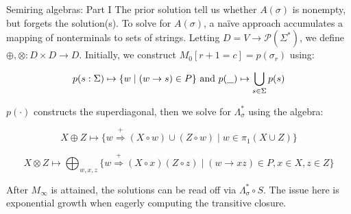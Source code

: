 \documentclass{beamer}
\newcommand\hole{\underline{\hspace{0.25cm}}}
\begin{document}
\begin{frame}[fragile]{Semiring algebras: Part I}
  The prior solution tell us whether $A(\sigma)$ is nonempty, but forgets the solution(s). To solve for $A(\sigma)$, a na\"ive approach accumulates a mapping of nonterminals to sets of strings. Letting $D = V \rightarrow \mathcal{P}(\Sigma^*)$, we define $\oplus, \otimes: D \times D \rightarrow D$. Initially, we construct $M_0[r+1=c] = p(\sigma_r)$ using:

  \begin{equation*}
    p(s: \Sigma) \mapsto \{w \mid (w \rightarrow s)\in P\} \text{ and } p(\hole) \mapsto \bigcup_{s\in \Sigma} p(s)
  \end{equation*}

  $p(\cdot)$ constructs the superdiagonal, then we solve for $\Lambda_\sigma^*$ using the algebra:

  \begin{equation*}
    X \oplus Z \mapsto \big\{w \stackrel{+}{\Rightarrow} (X \circ w) \cup (Z \circ w) \mid w \in \pi_1(X \cup Z)\big\}
  \end{equation*}

  \begin{equation*}
    X \otimes Z \mapsto \bigoplus_{w, x, z}\big\{w \stackrel{+}{\Rightarrow} (X\circ x)(Z\circ z) \mid (w\rightarrow xz) \in P, x\in X, z\in Z\big\}
  \end{equation*}

  \noindent After $M_\infty$ is attained, the solutions can be read off via $\Lambda_\sigma^* \circ S$. The issue here is exponential growth when eagerly computing the transitive closure.
\end{frame}
\end{document}
